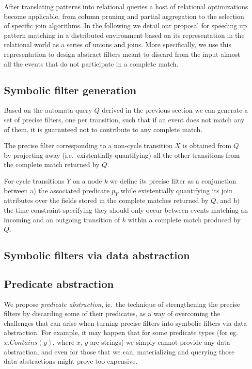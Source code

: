 After translating patterns into relational queries a host of relational 
optimizations become applicable, from column pruning and partial aggregation to
the selection of specific join algorithms.
In the following we detail our proposal for speeding up pattern matching in a 
distributed environment based on its representation in the relational world as 
a series of unions and joins.
More specifically, we use this representation to design {abstract} filters 
meant to discard from the input almost all the events that do not participate 
in a complete match. 



\subsection{Symbolic filter generation}
\label{sec:prec_filter_generation}

Based on the automata query $Q$ derived in the previous section we can generate
a set of precise filters, one per transition, such that if an event does not match
any of them, it is guaranteed not to contribute to any complete match.

The precise filter corresponding to a non-cycle transition $X$ is obtained from
$Q$ by projecting away (i.e.\ existentially quantifying) all the other transitions
from the complete match returned by $Q$.

For cycle transitions $Y$ on a node $k$ we define its precise filter as a
conjunction between 
a) the associated predicate $p_Y$ while existentially quantifying its join
attributes over the fields stored in the complete matches returned by $Q$, and
b) the time constraint specifying they should only occur between events matching
an incoming and an outgoing transition of $k$ within a complete match produced
by $Q$.

\subsection{Symbolic filters via data abstraction}
\label{sec:data_abstraction}


\subsection{Predicate abstraction}
\label{sec:pred_abstraction}


We propose {\em predicate abstraction}, ie.\ the technique of strengthening the
precise filters by discarding some of their predicates, as a way of overcoming
the challenges that can arise when turning precise filters into symbolic filters
via data abstraction.
For example, it may happen that for some predicate types
(for eg.\ $x.Contains(y)$, where $x$, $y$ are strings) we simply cannot provide
any data abstraction, and even for those that we can, materializing and querying
those data abstractions might prove too expensive.

